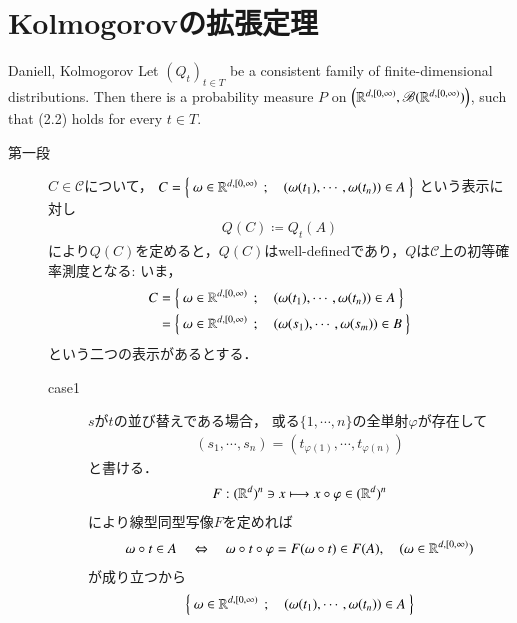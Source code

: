 \section{Kolmogorovの拡張定理}
	\begin{itembox}[l]{Daniell, Kolmogorov}
			Let $(Q_t)_{t \in T}$ be a consistent family of finite-dimensional 
			distributions. Then there is a probability measure $P$ on 
			$\left( \mathbb{R}^{d,[0,\infty)}, \mathscr{B}(\mathbb{R}^{d,[0,\infty)}) \right)$, such that 
			(2.2) holds for every $t \in T$.
	\end{itembox}
	
	\begin{prf}\mbox{}
		\begin{description}
			\item[第一段]
				$C \in \mathscr{C}$について，
				$C = \left\{\ \omega \in \mathbb{R}^{d,[0,\infty)}\ \, ; \quad (\omega(t_1),\cdots,\omega(t_n)) \in A\ \right\}$
				という表示に対し
				\begin{align}
					Q(C) \coloneqq Q_t(A)
				\end{align}
				により$Q(C)$を定めると，$Q(C)$はwell-definedであり，$Q$は$\mathscr{C}$上の初等確率測度となる:
				いま，
				\begin{align}
					C 
					&= \left\{\ \omega \in \mathbb{R}^{d,[0,\infty)}\ \, ; \quad (\omega(t_1),\cdots,\omega(t_n)) \in A\ \right\} \\
					&= \left\{\ \omega \in \mathbb{R}^{d,[0,\infty)}\ \, ; \quad (\omega(s_1),\cdots,\omega(s_m)) \in B\ \right\} 
				\end{align}
				という二つの表示があるとする．
				\begin{description}
					\item[case1]
						$s$が$t$の並び替えである場合，
						或る$\{1,\cdots,n\}$の全単射$\varphi$が存在して
						\begin{align}
							(s_1,\cdots,s_n) 
							= (t_{\varphi(1)},\cdots,t_{\varphi(n)})
						\end{align}
						と書ける．
						\begin{align}
							F:(\mathbb{R}^d)^n \ni x \longmapsto x \circ \varphi \in (\mathbb{R}^d)^n
						\end{align}
						により線型同型写像$F$を定めれば
						\begin{align}
							\omega \circ t \in A
							\quad \Leftrightarrow \quad \omega \circ t \circ \varphi 
							= F(\omega \circ t) \in F(A),
							\quad (\omega \in \mathbb{R}^{d,[0,\infty)})
						\end{align}
						が成り立つから
						\begin{align}
							\Set{\omega \in \R^{d,[0,\infty)}}{(\omega(t_1),\cdots,\omega(t_n)) \in A}

\end{align}
\end{description}
\end{description}
\end{prf}
